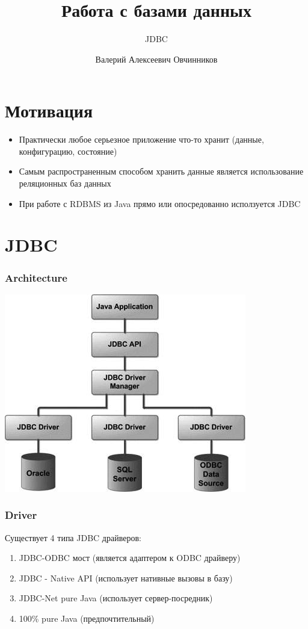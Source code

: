 \documentclass[russian,aspectratio=169,14pt]{beamer}
\title{Работа с базами данных}
\subtitle{JDBC}
\author{Валерий Алексеевич Овчинников}
\institute{valery.ovchinnikov@phystech.edu}
\begin{document}
\maketitle

\section{Мотивация}

\begin{frame}
	\begin{itemize}
		\item Практически любое серьезное приложение что-то хранит (данные, конфигурацию, состояние)
		\pause
		\item Самым распространенным способом хранить данные является использование реляционных баз данных
		\pause
		\item При работе с RDBMS из Java прямо или опосредованно исползуется JDBC
	\end{itemize}
\end{frame}

\section{JDBC}

\begin{frame}
	\frametitle{Architecture}
	\begin{center}
	\includegraphics[height=0.75\textheight]{jdbc-architecture.jpg}
	\end{center}
\end{frame}

\begin{frame}
	\frametitle{Driver}
	Существует 4 типа JDBC драйверов:
	\vfill
	\begin{enumerate}
		\item JDBC-ODBC мост (является адаптером к ODBC драйверу)
		\item JDBC - Native API (использует нативные вызовы в базу)
		\item JDBC-Net pure Java (использует сервер-посредник)
		\item 100\% pure Java (предпочтительный)
	\end{enumerate}
\end{frame}
\end{document}
